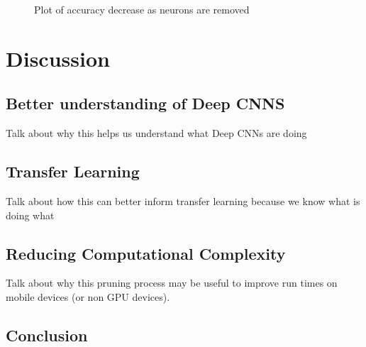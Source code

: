 \documentclass[10pt,twocolumn,letterpaper]{article}
\begin{document}
\begin{figure}
\caption{Plot of accuracy decrease as neurons are removed}
\label{fig:comp}
\end{figure}

\section{Discussion}

\subsection{Better understanding of Deep CNNS}
Talk about why this helps us understand what Deep CNNs are doing

\subsection{Transfer Learning}

Talk about how this can better inform transfer learning because we know what is doing what

\subsection{Reducing Computational Complexity}
Talk about why this pruning process may be useful to improve run times on mobile devices (or non GPU devices).

\subsection{Conclusion}



{\small


}
\end{document}
